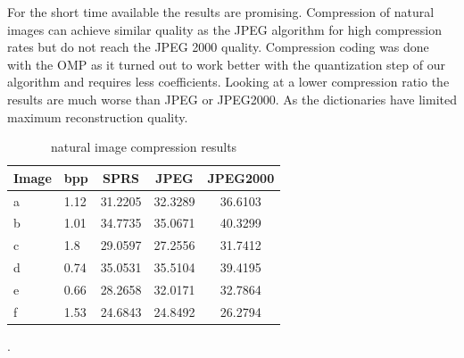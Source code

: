 For the short time available the results are promising. Compression of
natural images can achieve similar quality as the JPEG algorithm
 for high compression rates but do not reach the
JPEG 2000 quality. Compression coding was done with the OMP as it turned out to
work better with the quantization step of our algorithm and requires less
coefficients. Looking at a lower compression ratio the results are much worse
than JPEG or JPEG2000. As the dictionaries have limited maximum reconstruction
quality.

\begin{table}[h]
\centering

\begin{tabular}{| l l | c | c | c|}
\hline\hline
Image & bpp & SPRS & JPEG & JPEG2000 \\
\hline
a & 1.12 & 31.2205 & 32.3289 & 36.6103 \\
\hline
b & 1.01 & 34.7735 & 35.0671 & 40.3299 \\
\hline
c & 1.8  & 29.0597 & 27.2556 & 31.7412 \\
\hline
d & 0.74 & 35.0531 & 35.5104 & 39.4195 \\
\hline
e & 0.66 & 28.2658 & 32.0171 & 32.7864 \\
\hline
f & 1.53 & 24.6843  & 24.8492 & 26.2794 \\
\hline
\end{tabular}
\caption{natural image compression results}
\label{tab:compression1}.
\end{table} 


